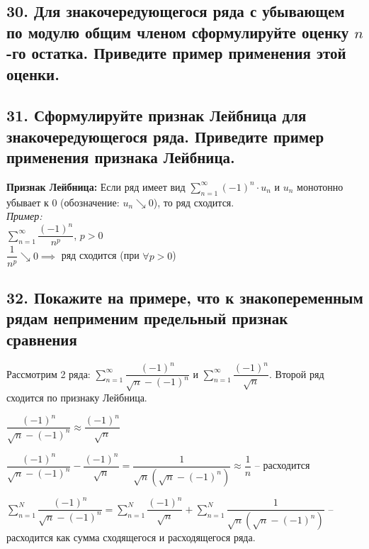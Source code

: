 \documentclass[a4paper, fleqn]{article}
\begin{document}
    \subsection*{30. Для знакочередующегося ряда с убывающем
     по модулю общим членом сформулируйте оценку $n$-го остатка.
      Приведите пример применения этой оценки.}
    \subsection*{31. Сформулируйте признак Лейбница для знакочередующегося ряда. Приведите пример применения признака Лейбница.}
    \textbf{Признак Лейбница:} Если ряд имеет вид $\sum_{n=1}^{\infty}(-1)^n \cdot u_n$ и $u_n$ монотонно убывает к $0$ (обозначение: $u_n \searrow 0$), то ряд сходится. \\
    \textit{Пример: } \\
    $\sum_{n=1}^{\infty} \dfrac{(-1)^{n}}{n^p}$, $p > 0$ \\
    $\dfrac{1}{n^p} \searrow 0 \implies $ ряд сходится (при $\forall p > 0$) \\
        
        \subsection*{32. Покажите на примере, что к знакопеременным рядам неприменим предельный признак сравнения}

        Рассмотрим 2 ряда: $\sum_{n=1}^{\infty} \dfrac{(-1)^{n}}{\sqrt{n} - (-1)^{n}}$ и $\sum_{n=1}^{\infty} \dfrac{(-1)^{n}}{\sqrt{n}}$. Второй ряд сходится по признаку Лейбница.

        $\dfrac{(-1)^{n}}{\sqrt{n} - (-1)^{n}} \approx \dfrac{(-1)^{n}}{\sqrt{n}}$

        $\dfrac{(-1)^{n}}{\sqrt{n} - (-1)^{n}} - \dfrac{(-1)^{n}}{\sqrt{n}} = \dfrac{1}{\sqrt{n}(\sqrt{n} - (-1)^{n})} \approx \dfrac{1}{n}$ -- расходится

        $\sum_{n=1}^{N} \dfrac{(-1)^{n}}{\sqrt{n} - (-1)^{n}} = \sum_{n=1}^{N} \dfrac{(-1)^{n}}{\sqrt{n}} + \sum_{n=1}^{N} \dfrac{1}{\sqrt{n}(\sqrt{n} - (-1)^{n})}$ -- расходится как сумма сходящегося и расходящегося ряда.
    
\end{document}
